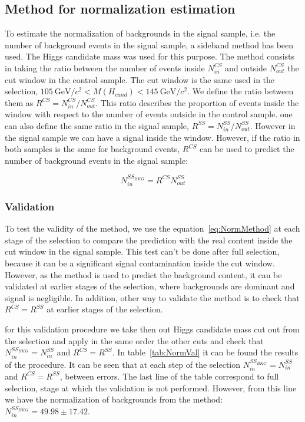 \subsection{Method for normalization estimation}
\label{sec:bkgnormmet}

To estimate the normalization of backgrounds in the signal sample, i.e. the number of background events in the signal sample, a sideband method has been used. The Higgs candidate mass was used for this purpose. The method consists in taking the ratio between the number of events inside $N^{CS}_{in}$ and outside $N^{CS}_{out}$ the cut window in the control sample. The cut window is the same used in the selection, $105~\text{GeV}/c^{2} <M(H_{cand})<145~\text{GeV}/c^{2}$. We define the ratio between them as $R^{CS}=N^{CS}_{in}/N^{CS}_{out}$. This ratio describes the proportion of events inside the window with respect to the number of events outside in the control sample. one can also define the same ratio in the signal sample, $R^{SS}=N^{SS}_{in}/N^{SS}_{out}$. However in the signal sample we can have a signal inside the window. However, if the ratio in both samples is the same for background events, $R^{CS}$ can be used to predict the number of background events in the signal sample:

\begin{equation}
  \label{eq:NormMethod}
  N^{SS_{BKG}}_{in}=R^{CS}N^{SS}_{out}
\end{equation}

\subsubsection{Validation}
\label{sec:normval}

To test the validity of the method, we use the equation~\ref{eq:NormMethod} at each stage of the selection to compare the prediction with the real content inside the cut window in the signal sample. This test can't be done after full selection, because it can be a significant signal contamination inside the cut window. However, as the method is used to predict the background content, it can be validated at earlier stages of the selection, where backgrounds are dominant and signal is negligible. In addition, other way to validate the method is to check that $R^{CS}=R^{SS}$ at earlier stages of the selection.

for this validation procedure we take then out Higgs candidate mass cut out from the selection and apply in the same order the other cuts and check that $N^{SS_{BKG}}_{in}=N^{SS}_{in}$ and $R^{CS}=R^{SS}$. In table~\ref{tab:NormVal} it can be found the results of the procedure. It can be seen that at each step of the selection $N^{SS_{BKG}}_{in}=N^{SS}_{in}$ and $R^{CS}=R^{SS}$, between errors. The last line of the table correspond to full selection, stage at which the validation is not performed. However, from this line we have the normalization of backgrounds from the method: $N^{SS_{BKG}}_{in}=49.98\pm17.42$.

